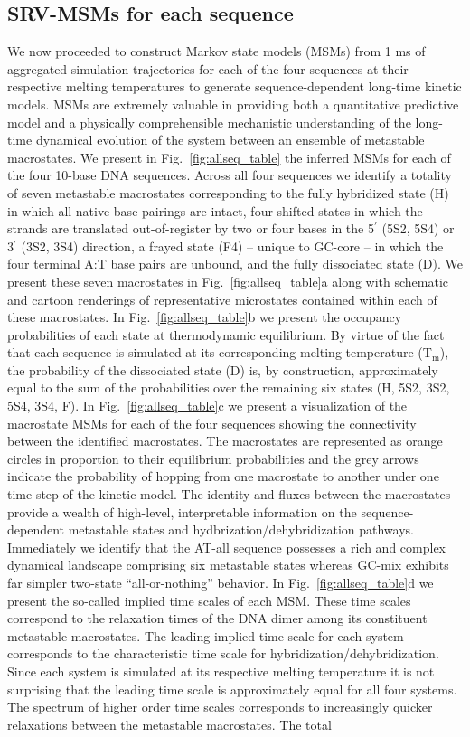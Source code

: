 \documentclass[journal=jpcbfk,manuscript=article]{achemso}
\begin{document}
\subsection{SRV-MSMs for each sequence}

We now proceeded to construct Markov state models (MSMs) from 1 ms of aggregated simulation trajectories for each of the four sequences at their respective melting temperatures to generate sequence-dependent long-time kinetic models. MSMs are extremely valuable in providing both a quantitative predictive model and a physically comprehensible mechanistic understanding of the long-time dynamical evolution of the system between an ensemble of metastable macrostates. We present in Fig.~\ref{fig:allseq_table} the inferred MSMs for each of the four 10-base DNA sequences. Across all four sequences we identify a totality of seven metastable macrostates corresponding to the fully hybridized state (H) in which all native base pairings are intact, four shifted states in which the strands are translated out-of-register by two or four bases in the 5$^\prime$ (5S2, 5S4) or 3$^\prime$ (3S2, 3S4) direction, a frayed state (F4) -- unique to GC-core -- in which the four terminal A:T base pairs are unbound, and the fully dissociated state (D). We present these seven macrostates in Fig.~\ref{fig:allseq_table}a along with schematic and cartoon renderings of representative microstates contained within each of these macrostates. In Fig.~\ref{fig:allseq_table}b we present the occupancy probabilities of each state at thermodynamic equilibrium. By virtue of the fact that each sequence is simulated at its corresponding melting temperature (T$_\mathrm{m}$), the probability of the dissociated state (D) is, by construction, approximately equal to the sum of the probabilities over the remaining six states (H, 5S2, 3S2, 5S4, 3S4, F). In Fig.~\ref{fig:allseq_table}c we present a visualization of the macrostate MSMs for each of the four sequences showing the connectivity between the identified macrostates. The macrostates are represented as orange circles in proportion to their equilibrium probabilities and the grey arrows indicate the probability of hopping from one macrostate to another under one time step of the kinetic model. The identity and fluxes between the macrostates provide a wealth of high-level, interpretable information on the sequence-dependent metastable states and hydbrization/dehybridization pathways. Immediately we identify that the AT-all sequence possesses a rich and complex dynamical landscape comprising six metastable states whereas GC-mix exhibits far simpler two-state ``all-or-nothing'' behavior. In Fig.~\ref{fig:allseq_table}d we present the so-called implied time scales of each MSM. These time scales correspond to the relaxation times of the DNA dimer among its constituent metastable macrostates. The leading implied time scale for each system corresponds to the characteristic time scale for hybridization/dehybridization. Since each system is simulated at its respective melting temperature it is not surprising that the leading time scale is approximately equal for all four systems. The spectrum of higher order time scales corresponds to increasingly quicker relaxations between the metastable macrostates. The total 
\end{document}

